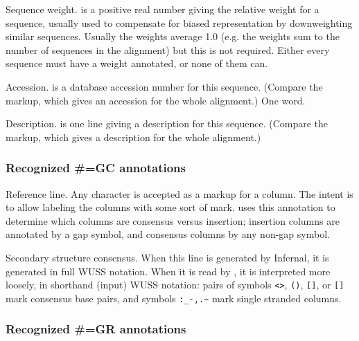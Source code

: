 \begin{sreitems}{}
\item [\emprog{WT  <f>}]
	Sequence weight.  is a positive real number giving the
	relative weight for a sequence, usually used to compensate
	for biased representation by downweighting similar sequences.	
	Usually the weights average 1.0 (e.g. the weights sum to
	the number of sequences in the alignment) but this is not
	required. Either every sequence must have a weight annotated, 
	or none	of them can.  

\item [\emprog{AC  <s>}]
	Accession.  is a database accession number for 
	this sequence. (Compare the  markup, which gives
	an accession for the whole alignment.) One word. 
	
\item [\emprog{DE  <s>}]
	Description.  is one line giving a description for
	this sequence. (Compare the  markup, which gives
	a description for the whole alignment.)
\end{sreitems}

\subsubsection{Recognized \#=GC annotations}

\begin{sreitems}{}
\item [\emprog{RF}]
	Reference line. Any character is accepted as a markup for a
	column. The intent is to allow labeling the columns with some
	sort of mark.  uses this annotation to 
        determine which columns are consensus versus insertion;
        insertion columns are annotated by a gap symbol, and consensus
        columns by any non-gap symbol.
	
\item [\emprog{SS\_cons}]
	Secondary structure consensus. 
        When this line is generated by Infernal, it is generated in full WUSS
        notation.
	When it is read by , it is interpreted more
        loosely, in shorthand (input) WUSS notation:
	pairs of symbols \verb+<>+, \verb+()+, \verb+[]+, or \verb+[]+ mark
	consensus base pairs, and symbols \verb+:_-,.~+ mark single
        stranded columns. 
\end{sreitems}

\subsubsection{Recognized \#=GR annotations}

